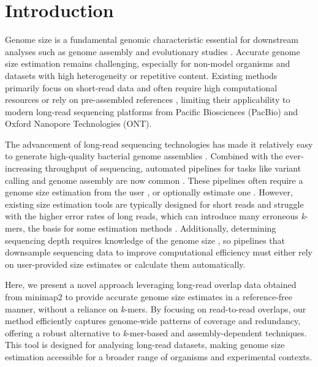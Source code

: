\documentclass[unnumsec,webpdf,modern,large]{oup-authoring-template}
\theoremstyle{thmstyleone}%
\theoremstyle{thmstyletwo}%
\theoremstyle{thmstylethree}%
\newcommand{\kmer}{\textit{k}-mer}
\begin{document}
\maketitle


\section{Introduction}

Genome size is a fundamental genomic characteristic essential for downstream analyses such as genome assembly \citep{wick_benchmarking_2020} and evolutionary studies \citep{pellicer_plant_2020}. Accurate genome size estimation remains challenging, especially for non-model organisms and datasets with high heterogeneity or repetitive content. Existing methods primarily focus on short-read data and often require high computational resources or rely on pre-assembled references \citep{vurture_genomescope_2017,ranallo-benavidez_genomescope_2020}, limiting their applicability to modern long-read sequencing platforms from Pacific Biosciences (PacBio) and Oxford Nanopore Technologies (ONT).

The advancement of long-read sequencing technologies has made it relatively easy to generate high-quality bacterial genome assemblies \citep{wick_assembling_2023}. Combined with the ever-increasing throughput of sequencing, automated pipelines for tasks like variant calling and genome assembly are now common \citep{murigneux_micropipe_2021,petit_bactopia_2020,bouras_hybracter_2024}. These pipelines often require a genome size estimation from the user \citep{murigneux_micropipe_2021}, or optionally estimate one \citep{petit_bactopia_2020,bouras_hybracter_2024}. However, existing size estimation tools are typically designed for short reads \citep{ranallo-benavidez_genomescope_2020,vurture_genomescope_2017} and struggle with the higher error rates of long reads, which can introduce many erroneous \kmer{}s, the basis for some estimation methods \citep{ondov_mash_2016,ranallo-benavidez_genomescope_2020}. Additionally, determining sequencing depth requires knowledge of the genome size \citep{hall_rasusa_2022}, so pipelines that downsample sequencing data to improve computational efficiency must either rely on user-provided size estimates or calculate them automatically.

Here, we present a novel approach leveraging long-read overlap data obtained from minimap2 \citep{li_minimap2_2018} to provide accurate genome size estimates in a reference-free manner, without a reliance on \kmer{}s. By focusing on read-to-read overlaps, our method efficiently captures genome-wide patterns of coverage and redundancy, offering a robust alternative to \kmer{}-based and assembly-dependent techniques. This tool is designed for analysing long-read datasets, making genome size estimation accessible for a broader range of organisms and experimental contexts.
\end{document}
